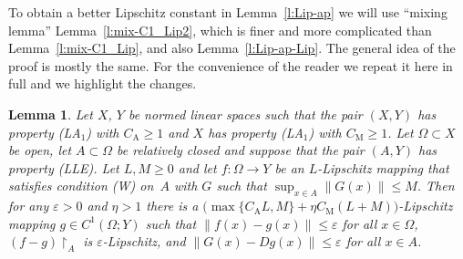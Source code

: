 \documentclass[a4paper,twoside,10pt,reqno,draft]{amsart}
\newtheorem{lemma}[theorem]{Lemma}
\theoremstyle{definition}
\theoremstyle{remark}
\newcommand\norm[1]{\mathopen\|#1\mathclose\|}
\newcommand\ve{\varepsilon}
\newcommand\Om{\Omega}
\newcommand\restr[1]{\mathclose\restriction_{#1}}
\newcommand\pLA[1]{(LA$_#1$)}
\newcommand\pLLE{(LLE)}
\newcommand\cW{(W)}
\newcommand\cCA{C_{\mathrm A}}
\newcommand\cCM{C_{\mathrm M}}
\begin{document}
To obtain a better Lipschitz constant in Lemma~\ref{l:Lip-ap} we will use ``mixing lemma'' Lemma~\ref{l:mix-C1_Lip2}, which is finer and more complicated than Lemma~\ref{l:mix-C1_Lip}, and also Lemma~\ref{l:Lip-ap-Lip}.
The general idea of the proof is mostly the same.
For the convenience of the reader we repeat it here in full and we highlight the changes.
\begin{lemma}\label{l:Lip-ap2}
Let $X$, $Y$ be normed linear spaces such that the pair $(X,Y)$ has property \pLA1 with $\cCA\ge1$ and $X$ has property \pLA1 with $\cCM\ge1$.
Let $\Om\subset X$ be open, let $A\subset\Om$ be relatively closed and suppose that the pair $(A,Y)$ has property \pLLE.
Let $L,M\ge0$ and let $f\colon\Om\to Y$ be an $L$-Lipschitz mapping that satisfies condition {\cW} on~$A$ with $G$ such that $\sup_{x\in A}\norm{G(x)}\le M$.
Then for any $\ve>0$ and $\eta>1$ there is a $\bigl(\max\{\cCA L,M\}+\eta\cCM(L+M)\bigr)$-Lipschitz mapping $g\in C^1(\Om;Y)$ such that $\norm{f(x)-g(x)}\le\ve$ for all $x\in\Om$, $(f-g)\restr A$ is $\ve$-Lipschitz, and $\norm{G(x)-Dg(x)}\le\ve$ for all $x\in A$.
\end{lemma}
\end{document}
